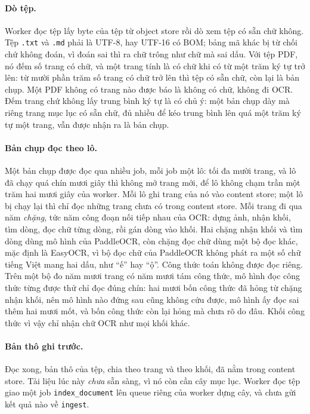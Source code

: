 \paragraph{Dò tệp.} Worker đọc tệp lấy byte của tệp từ object store rồi dò xem tệp có sẵn chữ không.
Tệp \texttt{.txt} và \texttt{.md} phải là UTF-8, hay UTF-16 có BOM; bảng mã khác bị từ chối chứ
không đoán, vì đoán sai thì ra chữ trông như chữ mà sai dấu. Với tệp PDF, nó đếm số trang có chữ, và
một trang tính là có chữ khi có từ một trăm ký tự trở lên: từ mười phần trăm số trang có chữ trở lên
thì tệp có sẵn chữ, còn lại là bản chụp. Một PDF không có trang nào được báo là không có chữ, không
đi OCR. Đếm trang chứ không lấy trung bình ký tự là có chủ ý: một bản chụp dày mà riêng trang mục
lục có sẵn chữ, đủ nhiều để kéo trung bình lên quá một trăm ký tự một trang, vẫn được nhận ra là bản
chụp.

\paragraph{Bản chụp đọc theo lô.} Một bản chụp được đọc qua nhiều job, mỗi job một lô: tối đa mười
trang, và lô đã chạy quá chín mươi giây thì không mở trang mới, để lô không chạm trần một trăm hai
mươi giây của worker. Mỗi lô ghi trang của nó vào content store; một lô bị chạy lại thì chỉ đọc
những trang chưa có trong content store. Mỗi trang đi qua năm \emph{chặng}, tức năm công đoạn nối
tiếp nhau của OCR: dựng ảnh, nhận khối, tìm dòng, đọc chữ từng dòng, rồi gán dòng vào khối. Hai
chặng nhận khối và tìm dòng dùng mô hình của PaddleOCR, còn chặng đọc chữ dùng một bộ đọc khác, mặc
định là EasyOCR, vì bộ đọc chữ của PaddleOCR không phát ra một số chữ tiếng Việt mang hai dấu, như
``ế'' hay ``ộ''. Công thức toán không được đọc riêng. Trên một bộ đo năm mươi trang có năm mươi tám
công thức, mô hình đọc công thức từng được thử chỉ đọc đúng chín: hai mươi bốn công thức đã hỏng từ
chặng nhận khối, nên mô hình nào đứng sau cũng không cứu được, mô hình ấy đọc sai thêm hai mươi mốt,
và bốn công thức còn lại hỏng mà chưa rõ do đâu. Khối công thức vì vậy chỉ nhận chữ OCR như mọi khối
khác.

\paragraph{Bản thô ghi trước.} Đọc xong, bản thô của tệp, chia theo trang và theo khối, đã nằm trong
content store. Tài liệu lúc này \emph{chưa} sẵn sàng, vì nó còn cần cây mục lục. Worker đọc tệp giao
một job \texttt{index\_document} lên queue riêng của worker dựng cây, và chưa gửi kết quả nào về
\texttt{ingest}.

